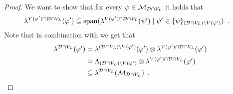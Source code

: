 \documentclass{theoretics}
\newcommand{\set}[1]{\{ #1 \}}
\newcommand{\eqperiod}{\enspace .}
\newcommand{\V}[1][]{V_{#1}}
\newcommand{\Vl}{\V[L]}
\newcommand{\linspace}[1][]{\ensuremath \Lambda_{{#1}}}
\newcommand{\linmapl}[2][]{\ensuremath \lambda^{{#2}}_{{#1}}}
\newcommand{\linmaplof}[3][]{\linmapl[#1]{#2}(#3)}
\newcommand{\diffclosure}[1][]{D_{{#1}}}
\renewcommand{\diffclosure}[1][]{\mathcal{D}_{{#1}}}
\newcommand{\matchb}{\varphi'}
\newcommand{\matchc}{\psi}
\newcommand{\matchd}{\psi'}
\newcommand{\matchings}[1][]{\ensuremath \mathcal{M}_{{#1}}}
\newcommand{\spans}[1]{\mathrm{span} ( #1 )}
\newcommand{\tensor}{\ensuremath \otimes}
\numberwithin{equation}{section}
\begin{document}
\begin{proof}
  We want to show that for every
  $\matchc \in \matchings[\diffclosure \cap \Vl]$ it holds that
  \begin{align}\label{eq:d_def}
    \linmaplof{V(\matchb) \cap \diffclosure \cap \Vl}{\matchb}
    &\subseteq
      \spans{\linmaplof{V(\matchb) \cap \diffclosure \cap \Vl}
      {\matchd} \mid \matchd \in
      \set{\matchc}_{(\diffclosure \cap \Vl) \setminus V(\matchb)}} \eqperiod
  \end{align}
  Note that in combination with  we get that
  \begin{align} \label{eq:d}
    \linmaplof{\diffclosure \cap \Vl}{\matchb}
    &=
      \linmaplof{(\diffclosure \cap \Vl) \setminus V(\matchb)}
      {\matchb} \tensor
      \linmaplof{V(\matchb) \cap \diffclosure \cap \Vl}{\matchb}\\
    &=
      \linspace[(\diffclosure \cap \Vl) \setminus V(\matchb)] \tensor
      \linmaplof{V(\matchb) \cap \diffclosure \cap \Vl}{\matchb}\\
    &\subseteq
      \linmaplof{\diffclosure \cap \Vl}{
      \matchings[\diffclosure \cap \Vl]}
      \eqperiod
  \end{align}


\end{proof}
\end{document}
